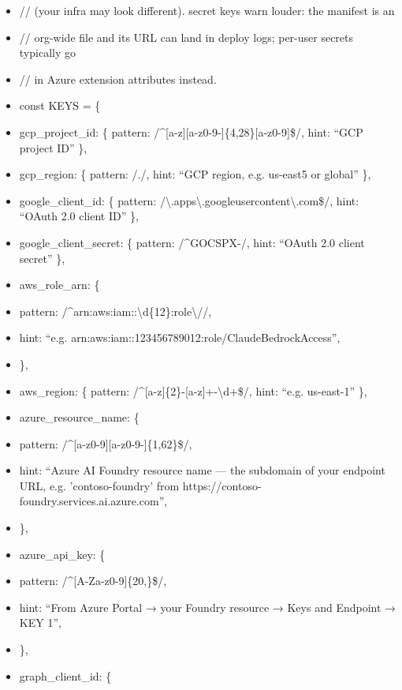 \documentclass[11pt]{article}
\begin{document}
\begin{itemize}[leftmargin=*,itemsep=2pt,topsep=2pt]
\item {} // (your infra may look different). secret keys warn louder: the manifest is an
\item {} // org-wide file and its URL can land in deploy logs; per-user secrets typically go
\item {} // in Azure extension attributes instead.
\item {} const KEYS = \{
\item {} gcp\_\allowbreak{}project\_\allowbreak{}id: \{ pattern: /\textasciicircum{}[a-z][a-z0-9-]\{4,28\}[a-z0-9]\$/, hint: ``GCP project ID'' \},
\item {} gcp\_\allowbreak{}region: \{ pattern: /./, hint: ``GCP region, e.g. us-east5 or global'' \},
\item {} google\_\allowbreak{}client\_\allowbreak{}id: \{ pattern: /\textbackslash{}.apps\textbackslash{}.googleusercontent\textbackslash{}.com\$/, hint: ``OAuth 2.0 client ID'' \},
\item {} google\_\allowbreak{}client\_\allowbreak{}secret: \{ pattern: /\textasciicircum{}GOCSPX-/, hint: ``OAuth 2.0 client secret'' \},
\item {} aws\_\allowbreak{}role\_\allowbreak{}arn: \{
\item {} pattern: /\textasciicircum{}arn:aws:iam::\textbackslash{}d\{12\}:role\textbackslash{}//,
\item {} hint: ``e.g. arn:aws:iam::123456789012:role/ClaudeBedrockAccess'',
\item {} \},
\item {} aws\_\allowbreak{}region: \{ pattern: /\textasciicircum{}[a-z]\{2\}-[a-z]+-\textbackslash{}d+\$/, hint: ``e.g. us-east-1'' \},
\item {} azure\_\allowbreak{}resource\_\allowbreak{}name: \{
\item {} pattern: /\textasciicircum{}[a-z0-9][a-z0-9-]\{1,62\}\$/,
\item {} hint: ``Azure AI Foundry resource name — the subdomain of your endpoint URL, e.g. 'contoso-foundry' from https://contoso-foundry.services.ai.azure.com'',
\item {} \},
\item {} azure\_\allowbreak{}api\_\allowbreak{}key: \{
\item {} pattern: /\textasciicircum{}[A-Za-z0-9]\{20,\}\$/,
\item {} hint: ``From Azure Portal → your Foundry resource → Keys and Endpoint → KEY 1'',
\item {} \},
\item {} graph\_\allowbreak{}client\_\allowbreak{}id: \{

\end{itemize}
\end{document}
